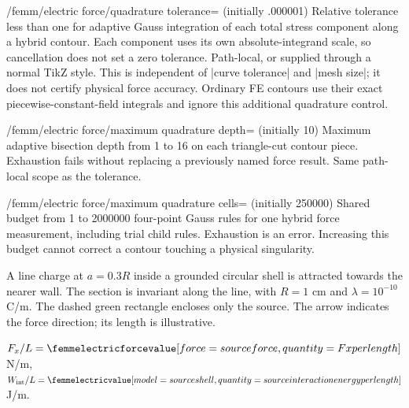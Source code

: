 \begin{key}{/femm/electric force/quadrature tolerance= (initially .000001)}
Relative tolerance less than one for adaptive Gauss integration of each total
stress component along a hybrid contour. Each component uses its own
absolute-integrand scale, so cancellation does not set a zero tolerance.
Path-local, or supplied through a normal TikZ style. This is independent of
|curve tolerance| and |mesh size|; it does not certify physical force accuracy.
Ordinary FE contours use their exact piecewise-constant-field integrals and
ignore this additional quadrature control.
\end{key}
\begin{key}{/femm/electric force/maximum quadrature depth= (initially 10)}
Maximum adaptive bisection depth from 1 to 16 on each triangle-cut contour
piece. Exhaustion fails without replacing a previously named force result.
Same path-local scope as the tolerance.
\end{key}
\begin{key}{/femm/electric force/maximum quadrature cells= (initially 250000)}
Shared budget from 1 to 2000000 four-point Gauss rules for one hybrid force
measurement, including trial child rules. Exhaustion is an error. Increasing
this budget cannot correct a contour touching a physical singularity.
\end{key}

A line charge at $a=0.3R$ inside a grounded circular shell is attracted towards
the nearer wall. The section is invariant along the line, with $R=1$ cm and
$\lambda=10^{-10}$ C/m. The dashed green rectangle encloses only the source.
The arrow indicates the force direction; its length is illustrative.

\Needspace{21cm}
\begin{codeexample}[width=0pt]

$F_x/L=\femmelectricforcevalue[force=source force,
    quantity=Fx per length]$ N/m,
\quad
$W_{\rm int}/L=\femmelectricvalue[model=source shell,
    quantity=source interaction energy per length]$ J/m.
\end{codeexample}

